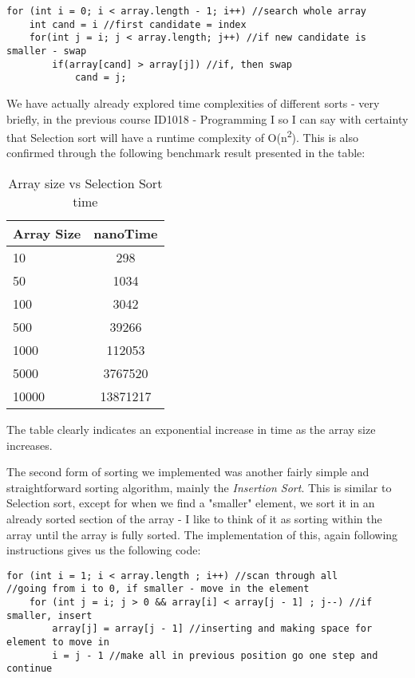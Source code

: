 \documentclass[a4paper,11pt]{article}
\begin{document}
\begin{verbatim}
for (int i = 0; i < array.length - 1; i++) //search whole array
    int cand = i //first candidate = index
    for(int j = i; j < array.length; j++) //if new candidate is smaller - swap
        if(array[cand] > array[j]) //if, then swap
            cand = j;
\end{verbatim}

We have actually already explored time complexities of different sorts - very briefly, in the previous course ID1018 - Programming I so I can say with certainty that Selection sort will have a runtime complexity of O(n\textsuperscript{2}). This is also confirmed through the following benchmark result presented in the table:

\begin{table}[h]
\begin{center}
\begin{tabular}{l|c}
\textbf{Array Size} & \textbf{nanoTime}\\
\hline
  10      &  298    \\
  50     &  1034   \\
  100    &  3042   \\
  500   &  39266  \\
  1000  &  112053 \\
  5000  &  3767520    \\
  10000 &  13871217   \\

\end{tabular}
\caption{Array size vs Selection Sort time}
\label{tab:table1}
\end{center}
\end{table}
The table clearly indicates an exponential increase in time as the array size increases.


The second form of sorting we implemented was another fairly simple and straightforward sorting algorithm, mainly the {\em Insertion Sort}. This is similar to Selection sort, except for when we find a "smaller" element, we sort it in an already sorted section of the array - I like to think of it as sorting within the array until the array is fully sorted. The implementation of this, again following instructions gives us the following code:

\begin{verbatim}
for (int i = 1; i < array.length ; i++) //scan through all
//going from i to 0, if smaller - move in the element
    for (int j = i; j > 0 && array[i] < array[j - 1] ; j--) //if smaller, insert
        array[j] = array[j - 1] //inserting and making space for element to move in
        i = j - 1 //make all in previous position go one step and continue
\end{verbatim}
\end{document}
